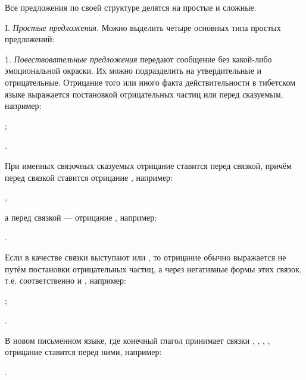 Все предложения по своей структуре делятся на простые и сложные.

I. \emph{Простые предложения}. Можно выделить четыре основных типа простых предложений:

1. \emph{Повествовательные предложения} передают сообщение без какой-либо эмоциональной окраски. Их можно подразделить на утвердительные и отрицательные. Отрицание того или иного факта действительности в тибетском языке выражается постановкой отрицательных частиц  или  перед сказуемым, например:
\begin{prfsample}
	\item {};
	\item {}.
\end{prfsample}
При именных связочных сказуемых отрицание ставится перед связкой, причём перед связкой
 ставится отрицание , например:
\begin{prfsample}
	\item {},
\end{prfsample}
а перед связкой	 --- отрицание , например:
\begin{prfsample}
	\item {}.	
\end{prfsample}
Если в качестве связки выступают  или , то отрицание обычно выражается не путём постановки отрицательных частиц, а через негативные формы этих связок, т.е. соответственно  и ,
например:
\begin{prfsample}
	\item {};
	\item {}.
\end{prfsample}

В новом письменном языке, где конечный глагол принимает связки
, , , ,
отрицание ставится перед ними, например:
\begin{prfsample}
	\item {}.
\end{prfsample}

